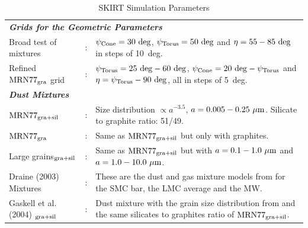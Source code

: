 \begin{table}
    \renewcommand{\arraystretch}{1.5}
    \caption{\label{tab:SKIRT_params} SKIRT Simulation Parameters}
    \small
    \begin{tabular}{lcp{}}
        \hline \hline
        \multicolumn{3}{l}{{\textbf{\textit{Grids for the Geometric Parameters}}}}\\
        Broad test of mixtures &:& $\psi_{\rm Cone} = 30~\rm deg$, $\psi_{\rm Torus} = 50~\rm deg$ and $\eta = 55-85~\rm deg$ in steps of 10~deg.\\
        Refined $\rm MRN77_{\rm gra}$ grid &:&  $\psi_{\rm Torus} = 25~\rm deg - 60~\rm deg$, $\psi_{\rm Cone} = 20~\rm deg - \psi_{\rm Torus}$ and $\eta = \psi_{\rm Torus} - 90~\rm deg$, all in steps of 5~deg.\\[5pt]

        \multicolumn{3}{l}{{\textbf{\textit{Dust Mixtures}}}}\\
        $\rm MRN77_{\rm gra+sil}$ &:&  Size distribution $\propto a^{-3.5}$, $a = 0.005 - 0.25~\mu\rm m$. Silicate to graphite ratio: 51/49.\\
        $\rm MRN77_{\rm gra}$ &:&  Same as $\rm MRN77_{\rm gra+sil}$ but only with graphites.\\
        Large grains$_{\rm gra+sil}$ &:& Same as $\rm MRN77_{\rm gra+sil}$ but with $a = 0.1 - 1.0~\mu\rm m$ and $a = 1.0 - 10.0~\mu\rm m$.\\
        Draine (2003) Mixtures &:& These are the dust and gas mixture models from \citet{draine03} for the SMC bar, the LMC average and the MW.\\
        Gaskell et al. (2004) $_{\rm gra+sil}$ &:& Dust mixture with the grain size distribution from \citet{gaskell04} and the same silicates to graphites ratio of $\rm MRN77_{\rm gra+sil}$.\\
        \hline
    \end{tabular}
\end{table}